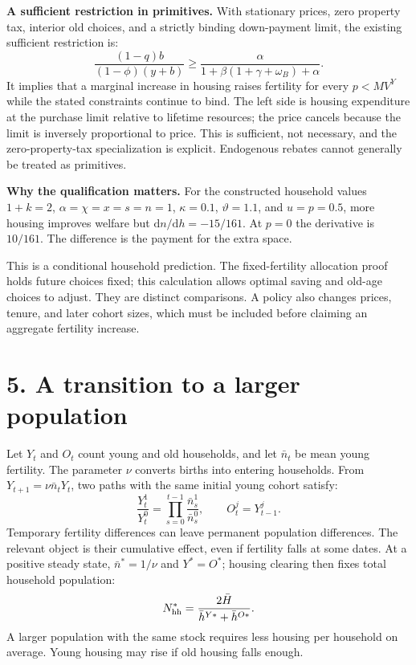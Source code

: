 \documentclass[11pt]{article}
\newcommand{\dd}{\mathrm d}
\newcommand{\pageheading}[1]{\section*{#1}}
\begin{document}
\textbf{A sufficient restriction in primitives.} With stationary prices,
zero property tax, interior old choices, and a strictly binding down-payment
limit, the existing sufficient restriction is:
\begin{equation}
 \frac{(1-q)b}{(1-\phi)(y+b)}
 \geq\frac{\alpha}{1+\beta(1+\gamma+\omega_B)+\alpha}.
 \label{eq:simple_primitive}
\end{equation}
It implies that a marginal increase in housing raises fertility for every
$p<MV^Y$ while the stated constraints continue to bind. The left side is
housing expenditure at the purchase limit relative to lifetime resources;
the price cancels because the limit is inversely proportional to price.
This is sufficient, not necessary, and the zero-property-tax specialization
is explicit. Endogenous rebates cannot generally be treated as primitives.

\textbf{Why the qualification matters.} For the constructed household values
$1+k=2$, $\alpha=\chi=x=s=n=1$, $\kappa=0.1$, $\vartheta=1.1$, and
$u=p=0.5$, more housing improves welfare but
$\dd n/\dd h=-15/161$. At $p=0$ the derivative is $10/161$.
The difference is the payment for the extra space.

This is a conditional household prediction. The fixed-fertility allocation
proof holds future choices fixed; this calculation allows optimal saving and
old-age choices to adjust. They are distinct comparisons. A policy also changes
prices, tenure, and later cohort sizes, which must be included before claiming
an aggregate fertility increase.

\newpage
\pageheading{5. A transition to a larger population}

Let $Y_t$ and $O_t$ count young and old households, and let $\bar n_t$ be
mean young fertility. The parameter $\nu$ converts births into entering
households. From $Y_{t+1}=\nu\bar n_tY_t$, two paths with the same initial
young cohort satisfy:
\begin{equation}
 \frac{Y_t^1}{Y_t^0}=\prod_{s=0}^{t-1}
 \frac{\bar n_s^1}{\bar n_s^0},\qquad O_t^j=Y_{t-1}^j.
 \label{eq:simple_population_product}
\end{equation}
Temporary fertility differences can leave permanent population differences.
The relevant object is their cumulative effect, even if fertility falls at
some dates. At a positive steady state, $\bar n^*=1/\nu$ and $Y^*=O^*$;
housing clearing then fixes total household population:
\begin{equation}
 N_{\rm hh}^*=\frac{2\bar H}{\bar h^{Y*}+\bar h^{O*}}.
 \label{eq:simple_population_stock}
\end{equation}
A larger population with the same stock requires less housing per household
on average. Young housing may rise if old housing falls enough.
\end{document}

